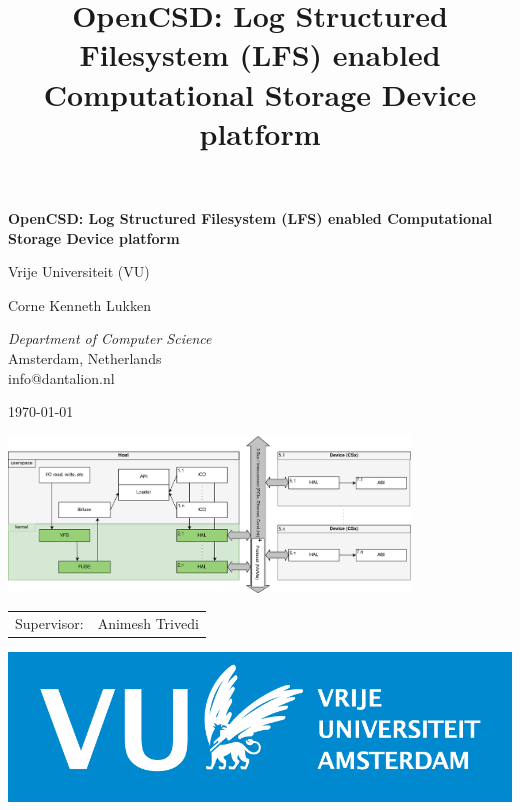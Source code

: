 \documentclass[conference]{IEEEtran}
\title{OpenCSD: Log Structured Filesystem (LFS) enabled Computational Storage Device platform%
}
\begin{document}
\begin{titlepage}
\begingroup
\centering
{\LARGE\bfseries OpenCSD: Log Structured Filesystem (LFS) enabled Computational Storage Device platform}

\vspace{1cm}

{\Large Vrije Universiteit (VU)}

\vspace{0.5cm}

{Corne Kenneth Lukken}

{\textit{Department of Computer Science} \\
Amsterdam, Netherlands \\
info@dantalion.nl}

\vspace{0.5cm}

\today

\vspace{4.0cm}

\includegraphics[width=0.8\textwidth]{resources/images/loader-pfs-arch-2.drawio.png}

\vfill
\endgroup
\begin{minipage}{0.4\textwidth}
	\begin{tabular}{ll}
		\Large Supervisor: & \Large Animesh Trivedi \\
	\end{tabular}
\end{minipage} \hfill
\begin{minipage}{0.3\textwidth}
	\begin{flushright}
	\includegraphics[width=\textwidth]{resources/images/vu-logo.png}
\end{flushright}
\end{minipage}
\end{titlepage}
\end{document}
